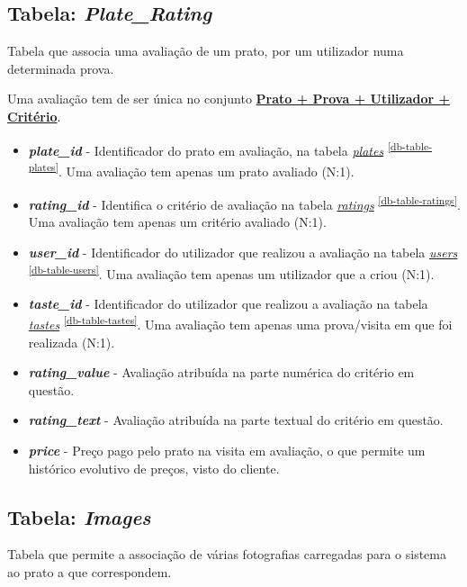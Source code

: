 \documentclass[11pt, a4paper, sans]{article}
\begin{document}
	\subsection{Tabela: \textit{Plate\_Rating}} \label{db-table-plate-rating}
	
	Tabela que associa uma avaliação de um prato, por um utilizador numa determinada prova. 
	
	Uma avaliação tem de ser única no conjunto \underline{\textbf{Prato + Prova + Utilizador + Critério}}.
	
	\begin{itemize}
		\item \textbf{\textit{plate\_id}} - Identificador do prato em avaliação, na tabela 
			\underline{\textit{plates}} \textsuperscript{\ref{db-table-plates}}. 
			Uma avaliação tem apenas um prato avaliado (N:1).
		\item \textbf{\textit{rating\_id}} - Identifica o critério de avaliação na tabela 
			\underline{\textit{ratings}} \textsuperscript{\ref{db-table-ratings}}.
			Uma avaliação tem apenas um critério avaliado (N:1).
		\item \textbf{\textit{user\_id}} - Identificador do utilizador que realizou a avaliação na tabela 
			\underline{\textit{users}} \textsuperscript{\ref{db-table-users}}.
			Uma avaliação tem apenas um utilizador que a criou (N:1).
		\item \textbf{\textit{taste\_id}} - Identificador do utilizador que realizou a avaliação na tabela 
			\underline{\textit{tastes}} \textsuperscript{\ref{db-table-tastes}}.
			Uma avaliação tem apenas uma prova/visita em que foi realizada (N:1).
		\item \textbf{\textit{rating\_value}} - Avaliação atribuída na parte numérica do critério em questão.
		\item \textbf{\textit{rating\_text}} - Avaliação atribuída na parte textual do critério em questão.
		\item \textbf{\textit{price}} - Preço pago pelo prato na visita em avaliação, o que permite um histórico
			evolutivo de preços, visto do cliente.
	\end{itemize}

	\subsection{Tabela: \textit{Images}} \label{db-table-plate-images}

	Tabela que permite a associação de várias fotografias carregadas para o sistema ao prato a que correspondem. 
	
\end{document}
